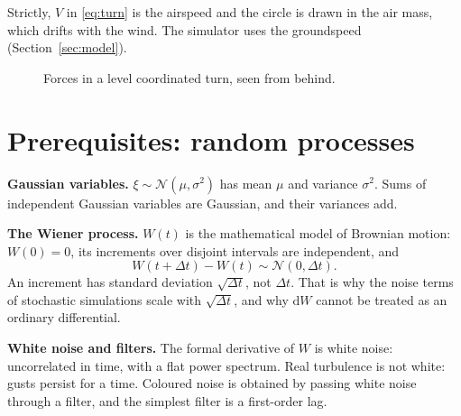 \documentclass[11pt,a4paper]{article}
\newcommand{\dd}{\mathrm{d}}
\begin{document}
Strictly, $V$ in \eqref{eq:turn} is the airspeed and the circle is drawn in
the air mass, which drifts with the wind. The simulator uses the groundspeed
(Section~\ref{sec:model}).

\begin{figure}[H]
\centering
{}
\caption{Forces in a level coordinated turn, seen from behind.}
\label{fig:turn}
\end{figure}

\section{Prerequisites: random processes}\label{app:stoch}

\textbf{Gaussian variables.} $\xi\sim\mathcal N(\mu,\sigma^2)$ has mean $\mu$
and variance $\sigma^2$. Sums of independent Gaussian variables are Gaussian,
and their variances add.

\textbf{The Wiener process.} $W(t)$ is the mathematical model of Brownian
motion: $W(0)=0$, its increments over disjoint intervals are independent, and
\[
W(t+\Delta t)-W(t)\sim\mathcal N(0,\Delta t).
\]
An increment has standard deviation $\sqrt{\Delta t}$, not $\Delta t$. That is
why the noise terms of stochastic simulations scale with $\sqrt{\Delta t}$,
and why $\dd W$ cannot be treated as an ordinary differential.

\textbf{White noise and filters.} The formal derivative of $W$ is white noise:
uncorrelated in time, with a flat power spectrum. Real turbulence is not
white: gusts persist for a time. Coloured noise is obtained by passing white
noise through a filter, and the simplest filter is a first-order lag.
\end{document}
